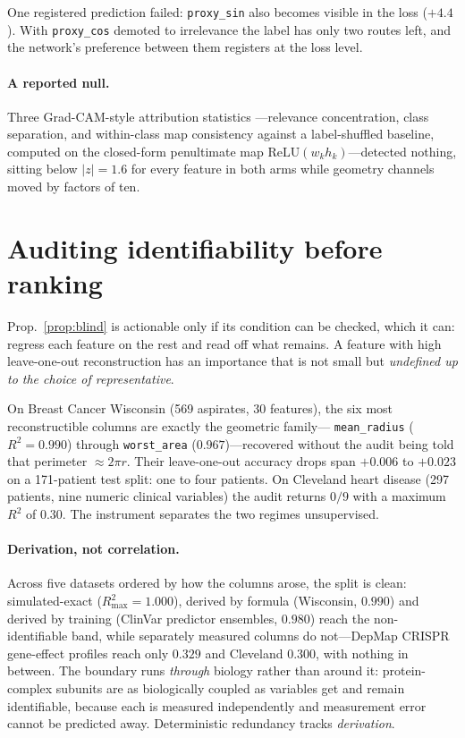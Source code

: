 One registered prediction failed: \texttt{proxy\_sin} also becomes visible in
the loss ($+4.4$). With \texttt{proxy\_cos} demoted to irrelevance the label has
only two routes left, and the network's preference between them registers at the
loss level.

\paragraph{A reported null.} Three Grad-CAM-style attribution statistics
\citep{selvaraju2017gradcam}---relevance concentration, class separation, and
within-class map consistency against a label-shuffled baseline, computed on the
closed-form penultimate map $\mathrm{ReLU}(w_k h_k)$---detected nothing, sitting
below $|z| = 1.6$ for every feature in both arms while geometry channels moved
by factors of ten.

\section{Auditing identifiability before ranking}\label{sec:audit}

Prop.~\ref{prop:blind} is actionable only if its condition can be checked, which
it can: regress each feature on the rest and read off what remains. A feature
with high leave-one-out reconstruction has an importance that is not small but
\emph{undefined up to the choice of representative}.

On Breast Cancer Wisconsin (569 aspirates, 30 features), the six most
reconstructible columns are exactly the geometric family---%
\texttt{mean\_radius} ($R^2 = 0.990$) through \texttt{worst\_area}
($0.967$)---recovered without the audit being told that perimeter $\approx 2\pi
r$. Their leave-one-out accuracy drops span $+0.006$ to $+0.023$ on a
171-patient test split: one to four patients. On Cleveland heart disease
(297 patients, nine numeric clinical variables) the audit returns $0/9$ with a
maximum $R^2$ of $0.30$. The instrument separates the two regimes unsupervised.

\paragraph{Derivation, not correlation.} Across five datasets ordered by how the
columns arose, the split is clean: simulated-exact ($R^2_{\max} = 1.000$),
derived by formula (Wisconsin, $0.990$) and derived by training (ClinVar
predictor ensembles, $0.980$) reach the non-identifiable band, while separately
measured columns do not---DepMap CRISPR gene-effect profiles reach only $0.329$
and Cleveland $0.300$, with nothing in between. The boundary runs \emph{through}
biology rather than around it: protein-complex subunits are as biologically
coupled as variables get and remain identifiable, because each is measured
independently and measurement error cannot be predicted away. Deterministic
redundancy tracks \emph{derivation}.

